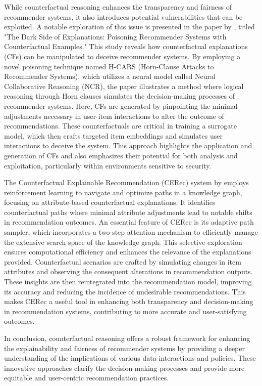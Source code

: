 While counterfactual reasoning enhances the transparency and fairness of
recommender systems, it also introduces potential vulnerabilities that can be exploited.
A notable exploration of this issue is presented in the paper by \textcite{chen_dark_2023},
titled "The Dark Side of Explanations: Poisoning Recommender Systems with
Counterfactual Examples." This study reveals how counterfactual explanations (CFs)
can be manipulated to deceive recommender systems. By employing a novel poisoning
technique named H-CARS (Horn-Clause Attacks to Recommender Systems), which
utilizes a neural model called Neural Collaborative Reasoning (NCR), the paper illustrates
a method where logical reasoning through Horn clauses simulates the decision-making
processes of recommender systems. Here, CFs are generated by pinpointing the minimal
adjustments necessary in user-item interactions to alter the outcome of recommendations.
These counterfactuals are critical in training a surrogate model, which then crafts
targeted item embeddings and simulates user interactions to deceive the system.
This approach highlights the application and generation of CFs and also
emphasizes their potential for both analysis and exploitation, particularly within
environments sensitive to security.

The Counterfactual Explainable Recommendation (CERec) system by \textcite{wang_reinforced_2024}
employs reinforcement learning to navigate and optimize
paths in a knowledge graph, focusing on attribute-based counterfactual
explanations. It identifies counterfactual paths where minimal attribute adjustments
lead to notable shifts in recommendation outcomes. An essential feature of CERec
is its adaptive path sampler, which incorporates a two-step attention mechanism to
efficiently manage the extensive search space of the knowledge graph. This
selective exploration ensures computational efficiency and enhances the
relevance of the explanations provided. Counterfactual scenarios are crafted by simulating
changes in item attributes and observing the consequent alterations in recommendation
outputs. These insights are then reintegrated into the recommendation model, improving
its accuracy and reducing the incidence of undesirable recommendations. This
makes CERec a useful tool in enhancing both transparency and decision-making in
recommendation systems, contributing to more accurate and user-satisfying outcomes.

In conclusion, counterfactual reasoning offers a robust framework for enhancing
the explainability and fairness of recommender systems by providing a deeper
understanding of the implications of various data interactions and policies. These
innovative approaches clarify the decision-making processes and provide
more equitable and user-centric recommendation practices.

